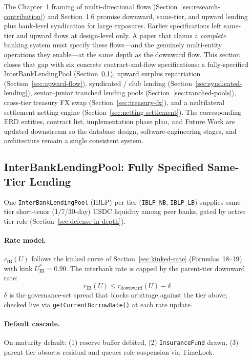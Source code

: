 \documentclass[12pt,a4paper]{report}
\begin{document}
The Chapter~1 framing of multi-directional flows (Section~\ref{sec:research-contribution}) and Section~1.6 promise downward, same-tier, and upward lending plus bank-level syndication for large exposures. Earlier specifications left same-tier and upward flows at design-level only. A paper that claims a \emph{complete} banking system must specify these flows---and the genuinely multi-entity operations they enable---at the same depth as the downward flow. This section closes that gap with six concrete contract-and-flow specifications: a fully-specified InterBankLendingPool (Section~\ref{sec:interbank-pool}), upward surplus repatriation (Section~\ref{sec:upward-flow}), syndicated / club lending (Section~\ref{sec:syndicated-lending}), senior--junior tranched lending pools (Section~\ref{sec:tranched-pools}), cross-tier treasury FX swap (Section~\ref{sec:treasury-fx}), and a multilateral settlement netting engine (Section~\ref{sec:netting-settlement}). The corresponding ERD entities, contract list, implementation phase plan, and Future Work are updated downstream so the database design, software-engineering stages, and architecture remain a single consistent system.

\subsection{InterBankLendingPool: Fully Specified Same-Tier Lending}
\label{sec:interbank-pool}

One \texttt{InterBankLendingPool} (IBLP) per tier (\texttt{IBLP\_NB}, \texttt{IBLP\_LB}) supplies same-tier short-tenor (1/7/30-day) USDC liquidity among peer banks, gated by active tier role (Section~\ref{sec:defense-in-depth}).

\paragraph{Rate model.}
$r_{\text{IB}}(U)$ follows the kinked curve of Section~\ref{sec:kinked-rate} (Formulas~18--19) with kink $U^{*}_{\text{IB}} = 0.90$. The interbank rate is capped by the parent-tier downward rate:
\begin{equation}
r_{\text{IB}}(U) \le r_{\text{downward}}(U) - \delta
\end{equation}
\noindent $\delta$ is the governance-set spread that blocks arbitrage against the tier above; checked live via \texttt{getCurrentBorrowRate()} at each rate update.

\paragraph{Default cascade.}
On maturity default: (1) reserve buffer debited, (2) \texttt{InsuranceFund} drawn, (3) parent tier absorbs residual and queues role suspension via TimeLock.
\end{document}
